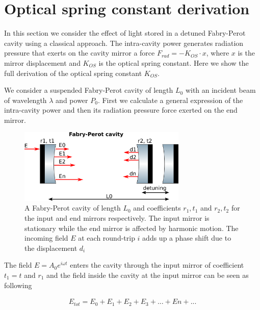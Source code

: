 \section{Optical spring constant derivation}
\label{app:A} 

In this section we consider the effect of light stored in a detuned Fabry-Perot cavity using a classical approach.
The intra-cavity power generates radiation pressure that exerts on the cavity mirror a force $F_{rad}=-K_{OS}\cdot x$,
where $x$ is the mirror displacement and $K_{OS}$ is the optical spring constant.
Here we show the full derivation of the optical spring constant $K_{OS}$.

We consider a suspended Fabry-Perot cavity of length $L_0$ %
with an incident beam of wavelength $\lambda$ and power $P_0$.
First we calculate a general expression of the intra-cavity power and then its  radiation pressure force exerted on the end mirror.\\


\begin{figure}[htbp]
	\centering
		\includegraphics[width=8cm]{./images/cavity_paper.pdf}
	\caption{A Fabry-Perot cavity of length $L_0$ and coefficients $r_1,t_1$ and $r_2,t_2$ for the input and end mirrors respectively. 
	The input mirror is stationary while the end mirror is affected by harmonic motion. The incoming field $E$ at each round-trip $i$ adds up a phase shift due to the displacement $d_i$}
	\label{fig:cavity_k}
\end{figure}


The field $E=A_0e^{i\omega t}$ enters the cavity through the input mirror of coefficient $t_1=t$ and $r_1$ and the field inside the cavity at the input mirror can be seen as following

\begin{eqnarray}
E_{tot}=E_0+E_1+E_2+E_3+...+En+...
\end{eqnarray}


